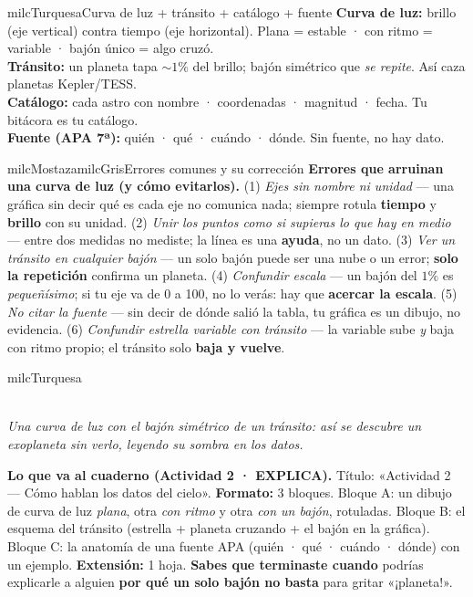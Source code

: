 \documentclass[11pt,letterpaper]{article}
\newcommand{\guiaDiagrama}[2]{%
\begin{center}
\\[1.5mm]
{\footnotesize\itshape\textcolor{milcNegro!75}{#2}}
\end{center}
}
\begin{document}
\begin{drawbox}{milcTurquesa}{Curva de luz + tránsito + catálogo + fuente}
\textbf{Curva de luz:} brillo (eje vertical) contra tiempo (eje horizontal). Plana = estable · con ritmo = variable · bajón único = algo cruzó. \\[1mm]
\textbf{Tránsito:} un planeta tapa $\sim 1\%$ del brillo; bajón simétrico que \emph{se repite}. Así caza planetas Kepler/TESS. \\[1mm]
\textbf{Catálogo:} cada astro con nombre · coordenadas · magnitud · fecha. Tu bitácora es tu catálogo. \\[1mm]
\textbf{Fuente (APA 7ª):} quién · qué · cuándo · dónde. Sin fuente, no hay dato.
\end{drawbox}

\begin{softbox}{milcMostaza}{milcGris}{Errores comunes y su corrección}
\textbf{Errores que arruinan una curva de luz (y cómo evitarlos).} (1) \emph{Ejes sin nombre ni unidad} --- una gráfica sin decir qué es cada eje no comunica nada; siempre rotula \textbf{tiempo} y \textbf{brillo} con su unidad. (2) \emph{Unir los puntos como si supieras lo que hay en medio} --- entre dos medidas no mediste; la línea es una \textbf{ayuda}, no un dato. (3) \emph{Ver un tránsito en cualquier bajón} --- un solo bajón puede ser una nube o un error; \textbf{solo la repetición} confirma un planeta. (4) \emph{Confundir escala} --- un bajón del $1\%$ es \emph{pequeñísimo}; si tu eje va de 0 a 100, no lo verás: hay que \textbf{acercar la escala}. (5) \emph{No citar la fuente} --- sin decir de dónde salió la tabla, tu gráfica es un dibujo, no evidencia. (6) \emph{Confundir estrella variable con tránsito} --- la variable sube \emph{y} baja con ritmo propio; el tránsito solo \textbf{baja y vuelve}.
\end{softbox}

\begin{infoband}{milcTurquesa}
\guiaDiagrama{assets/astronomia-2/curva-de-luz.tex}{Una curva de luz con el bajón simétrico de un tránsito: así se descubre un exoplaneta sin verlo, leyendo su sombra en los datos.}

\textbf{Lo que va al cuaderno (Actividad 2 · EXPLICA).} Título: «Actividad 2 --- Cómo hablan los datos del cielo». \textbf{Formato:} 3 bloques. Bloque A: un dibujo de curva de luz \emph{plana}, otra \emph{con ritmo} y otra \emph{con un bajón}, rotuladas. Bloque B: el esquema del tránsito (estrella + planeta cruzando + el bajón en la gráfica). Bloque C: la anatomía de una fuente APA (quién · qué · cuándo · dónde) con un ejemplo. \textbf{Extensión:} 1 hoja. \textbf{Sabes que terminaste cuando} podrías explicarle a alguien \textbf{por qué un solo bajón no basta} para gritar «¡planeta!».
\end{infoband}
\end{document}
